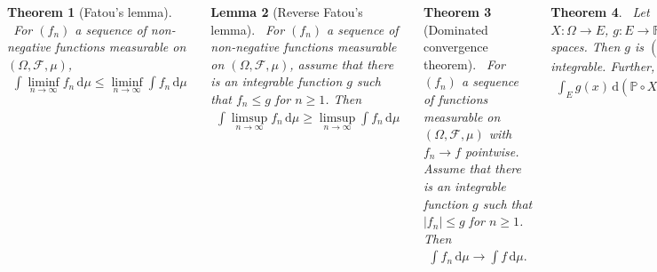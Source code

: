 \documentclass{tikzposter} %
\newtheorem{theorem}{Theorem}
\newtheorem{lemma}[theorem]{Lemma}
\newtheorem{definition}{Definition}
\begin{document}
\begin{columns}
{    \begin{theorem}[Fatou's lemma]
      \ For $(f_{n})$ a sequence of non-negative functions measurable on $(\Omega, \mathcal{F}, \mu)$,
      \begin{align*}
        \int \liminf_{n \to \infty} f_{n} \, \mathrm{d}\mu \le \liminf_{n \to \infty} \int f_{n} \, \mathrm{d}\mu
      \end{align*}
    \end{theorem}
    \hphantom{}

    \begin{lemma}[Reverse Fatou's lemma]
    \ For $(f_{n})$ a sequence of non-negative functions measurable on $(\Omega, \mathcal{F}, \mu)$, assume that there is an integrable function $g$ such that $f_{n} \le g$ for $n \ge 1$. Then
    \begin{align*}
      \int \limsup_{n \to \infty} f_{n} \, \mathrm{d}\mu \ge \limsup_{n \to \infty} \int f_{n} \, \mathrm{d}\mu
    \end{align*}
    \end{lemma}
    \hphantom{}

    \begin{theorem}[Dominated convergence theorem]
      \ For $(f_{n})$ a sequence of functions measurable on $(\Omega, \mathcal{F}, \mu)$ with $f_{n} \to f$ pointwise. Assume that there is an integrable function $g$ such that $|f_{n}| \le g$ for $n \ge 1$. Then
      \begin{align*}
        \int f_{n} \, \mathrm{d}\mu \to \int f \, \mathrm{d}\mu.
      \end{align*}
    \end{theorem}
    \hphantom{}

    \begin{theorem}
    \ Let $(\Omega, \mathcal{F}, \mathbb{P})$ be a probability space, $X : \Omega \to E$, $g : E \to \mathbb{R}$ measurable on their respective spaces. Then $g$ is $(\mathbb{P} \circ X^{-1})$-integrable iff $g \circ X$ is $\mathbb{P}$-integrable. Further,
    \begin{align*}
      \int_{E} g(x) \, \mathrm{d}(\mathbb{P} \circ X^{-1})(x) = \int_{\Omega} g(X(\omega)) \, \mathrm{d}\mathbb{P}(\omega).
    \end{align*}
    \end{theorem}
    \hphantom{}

    \begin{definition}[Expectation]
    \ For $X \in \mathcal{L}^{1}(\Omega, \mathcal{F}, \mathbb{P})$,
    \begin{align*}
      \mathbb{E}[X] = \int_{\Omega} X \, \mathrm{d}\mathbb{P}.
    \end{align*}
    \end{definition}
    \hphantom{}

}
\end{columns}
\end{document}
